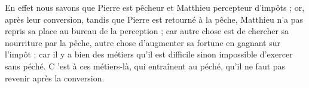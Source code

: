  En effet nous savons que Pierre est pêcheur et Matthieu percepteur d’impôts ; or, après leur conversion, tandis que Pierre est retourné à la pêche, Matthieu n’a pas repris sa place au bureau de la perception ; car autre chose est de chercher sa nourriture par la pêche, autre chose d’augmenter sa fortune en gagnant sur l’impôt ; car il y a bien des métiers qu’il est difficile sinon impossible d’exercer sans péché. C ’est à ces métiers-là, qui entraînent au péché, qu’il ne faut pas revenir après la conversion.